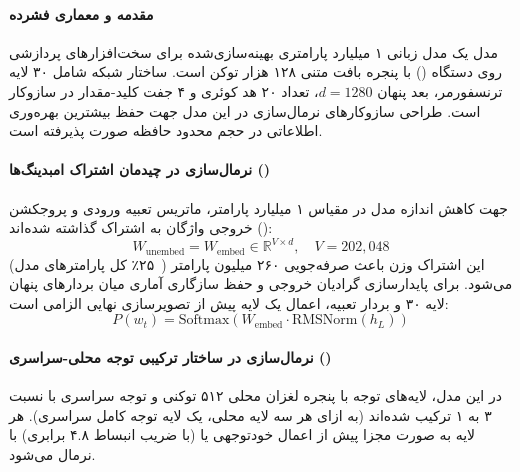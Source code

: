 \item {}

\paragraph*{مقدمه و معماری فشرده }
مدل  \cite{huber2025mobilellmpro} یک مدل زبانی ۱ میلیارد پارامتری بهینه‌سازی‌شده برای سخت‌افزارهای پردازشی روی دستگاه () با پنجره بافت متنی ۱۲۸ هزار توکن است. ساختار شبکه شامل ۳۰ لایه ترنسفورمر، بعد پنهان $d = 1280$، تعداد ۲۰ هد کوئری و ۴ جفت کلید-مقدار در سازوکار  است. طراحی سازوکارهای نرمال‌سازی در این مدل جهت حفظ بیشترین بهره‌وری اطلاعاتی در حجم محدود حافظه صورت پذیرفته است.

\paragraph*{نرمال‌سازی در چیدمان اشتراک امبدینگ‌ها ()}
جهت کاهش اندازه مدل در مقیاس ۱ میلیارد پارامتر، ماتریس تعبیه ورودی و پروجکشن خروجی واژگان به اشتراک گذاشته شده‌اند ():
\begin{equation}
    W_{\text{unembed}} = W_{\text{embed}} \in \mathbb{R}^{V \times d}, \quad V = 202,048
\end{equation}
این اشتراک وزن باعث صرفه‌جویی ۲۶۰ میلیون پارامتر (~۲۵٪ کل پارامترهای مدل) می‌شود. برای پایدارسازی گرادیان خروجی و حفظ سازگاری آماری میان بردارهای پنهان لایه ۳۰ و بردار تعبیه، اعمال یک لایه  پیش از تصویرسازی نهایی الزامی است:
\begin{equation}
    P(w_t) = \text{Softmax}\left( W_{\text{embed}} \cdot \text{RMSNorm}(h_L) \right)
\end{equation}

\paragraph*{نرمال‌سازی در ساختار ترکیبی توجه محلی-سراسری ()}
در این مدل، لایه‌های توجه با پنجره لغزان محلی ۵۱۲ توکنی و توجه سراسری با نسبت ۳ به ۱ ترکیب شده‌اند (به ازای هر سه لایه محلی، یک لایه توجه کامل سراسری). هر لایه به صورت مجزا پیش از اعمال خودتوجهی یا  (با ضریب انبساط ۴.۸ برابری) با  نرمال می‌شود.

